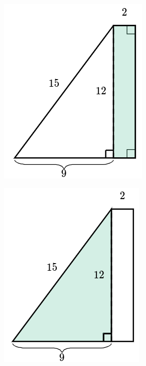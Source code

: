 \begin{solutionbox}{15cm}
\begin{minipage}{0.25\textwidth}
\begin{figure}[H]
            \caption{}
            \label{fig:area_compuesta_03a}
        \end{figure}
        \begin{figure}[H]
            \centering
            \includegraphics[width=0.5\linewidth]{../images/area_compuesta_03b.png}
            \caption{}
            \label{fig:area_compuesta_03b}
        \end{figure}
        \begin{figure}[H]
            \centering
            \includegraphics[width=0.5\linewidth]{../images/area_compuesta_03c.png}
            \caption{}
            \label{fig:area_compuesta_03c}
        \end{figure}
    \end{minipage}

\end{solutionbox}